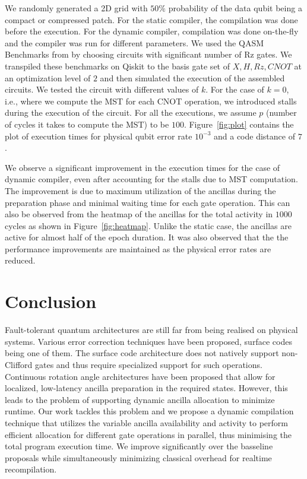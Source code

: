 We randomly generated a 2D grid with $50\%$ probability of the data qubit being a compact or compressed patch. For the static compiler, the compilation was done before the execution. For the dynamic compiler, compilation was done on-the-fly and the compiler was run for different parameters. We used the QASM Benchmarks from \cite{li2022qasmbench} by choosing circuits with significant number of Rz gates. We transpiled these benchmarks on Qiskit\cite{Qiskit} to the basis gate set of $X, H, Rz, CNOT$ at an optimization level of $2$ and then simulated the execution of the assembled circuits. We tested the circuit with different values of $k$. For the case of $k = 0$, i.e., where we compute the MST for each CNOT operation, we introduced stalls during the execution of the circuit. For all the executions, we assume $p$ (number of cycles it takes to compute the MST) to be $100$. Figure~\ref{fig:plot} contains the plot of execution times for physical qubit error rate $10^{-3}$ and a code distance of $7$.\par
We observe a significant improvement in the execution times for the case of dynamic compiler, even after accounting for the stalls due to MST computation. The improvement is due to maximum utilization of the ancillas during the preparation phase and minimal waiting time for each gate operation. This can also be observed from the heatmap of the ancillas for the total activity in $1000$ cycles as shown in Figure~\ref{fig:heatmap}. Unlike the static case, the ancillas are active for almost half of the epoch duration. It was also observed that the the performance improvements are maintained as the physical error rates are reduced.

\section{Conclusion}
Fault-tolerant quantum architectures are still far from being realised on physical systems. Various error correction techniques have been proposed, surface codes being one of them. The surface code architecture does not natively support non-Clifford gates and thus require specialized support for such operations. Continuous rotation angle architectures have been proposed that allow for localized, low-latency ancilla preparation in the required states. However, this leads to the problem of supporting dynamic ancilla allocation to minimize runtime. Our work tackles this problem and we propose a dynamic compilation technique that utilizes the variable ancilla availability and activity to perform efficient allocation for different gate operations in parallel, thus minimising the total program execution time. We improve significantly over the basseline proposals while simultaneously minimizing classical overhead for realtime recompilation.
